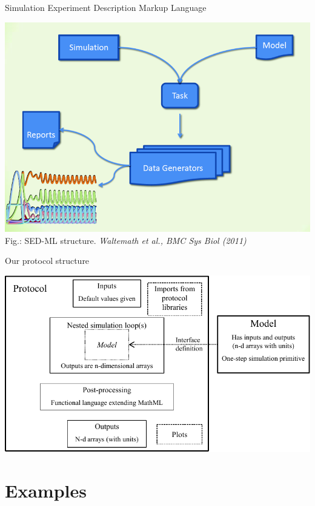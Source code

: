 \documentclass[t,xcolor={usenames,dvipsnames}]{beamer}
\begin{document}
\begin{frame}{Simulation Experiment Description Markup Language}
\begin{center}
\includegraphics[scale=.5]{SEDML_overview}\\
{\tiny Fig.: SED-ML structure. \textit{Waltemath et al., BMC Sys Biol (2011)}}
\end{center}
\end{frame}


\begin{frame}{Our protocol structure}
\begin{center}
\includegraphics[width=\textwidth]{protocol_language}
\end{center}
\end{frame}


\section{Examples}
\end{document}
